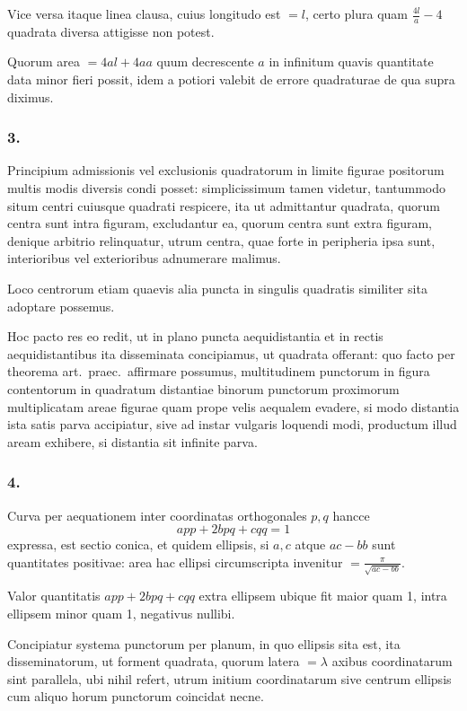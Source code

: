 \documentclass[12pt,a4paper]{article}
\begin{document}
Vice versa itaque linea clausa, cuius longitudo est $=l$, certo plura quam $\frac{4l}{a}-4$ quadrata diversa attigisse non potest.

Quorum area $=4al+4aa$ quum decrescente $a$ in infinitum quavis quantitate data minor fieri possit, idem a potiori valebit de errore quadraturae de qua supra diximus.

\subsubsection*{3.}

Principium admissionis vel exclusionis quadratorum in limite figurae positorum multis modis diversis condi posset: simplicissimum tamen videtur, tantummodo situm centri cuiusque quadrati respicere, ita ut admittantur quadrata, quorum centra sunt intra figuram, excludantur ea, quorum centra sunt extra figuram, denique arbitrio relinquatur, utrum centra, quae forte in peripheria ipsa sunt, interioribus vel exterioribus adnumerare malimus.

Loco centrorum etiam quaevis alia puncta in singulis quadratis similiter sita adoptare possemus.

Hoc pacto res eo redit, ut in plano puncta aequidistantia et in rectis aequidistantibus ita disseminata concipiamus, ut quadrata offerant: quo facto per theorema art.\ praec.\ affirmare possumus, multitudinem punctorum in figura contentorum in quadratum distantiae binorum punctorum proximorum multiplicatam areae figurae quam prope velis aequalem evadere, si modo distantia ista satis parva accipiatur, sive ad instar vulgaris loquendi modi, productum illud aream exhibere, si distantia sit infinite parva.

\subsubsection*{4.}

Curva per aequationem inter coordinatas orthogonales $p, q$ hancce
\[
app + 2bpq + cqq = 1
\]
expressa, est sectio conica, et quidem ellipsis, si $a, c$ atque $ac-bb$ sunt quantitates positivae: area hac ellipsi circumscripta invenitur $=\frac{\pi}{\sqrt{ac-bb}}$.

Valor quantitatis $app+2bpq+cqq$ extra ellipsem ubique fit maior quam 1, intra ellipsem minor quam 1, negativus nullibi.

Concipiatur systema punctorum per planum, in quo ellipsis sita est, ita disseminatorum, ut forment quadrata, quorum latera $=\lambda$ axibus coordinatarum sint parallela, ubi nihil refert, utrum initium coordinatarum sive centrum ellipsis cum aliquo horum punctorum coincidat necne.
\end{document}
